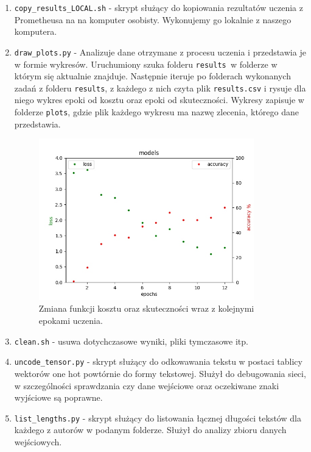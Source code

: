\begin{enumerate}
	\item {\texttt{copy\_results\_LOCAL.sh} } - skrypt służący do kopiowania rezultatów uczenia z Prometheusa na
	na komputer osobisty. Wykonujemy go lokalnie z naszego komputera.

	\item {\texttt{draw\_plots.py} } - Analizuje dane otrzymane z procesu uczenia i przedstawia je w formie wykresów.
	Uruchumiony szuka folderu \texttt{results }w folderze w którym się aktualnie znajduje. Następnie iteruje po folderach
	wykonanych zadań z folderu \texttt{results}, z każdego z nich czyta plik \texttt{results.csv} i rysuje dla niego wykres epoki od kosztu
 	oraz epoki od skuteczności. Wykresy zapisuje w folderze \texttt{plots}, gdzie plik każdego wykresu ma nazwę
 	zlecenia, którego dane przedstawia.

 	\begin{figure}[H]
	\centering
	\includegraphics[height=7cm]{./images/plot.jpg}
	\caption{Zmiana funkcji kosztu oraz skuteczności wraz z kolejnymi epokami uczenia.}
	\label{fig:test5}
	\end{figure}


	\item {\texttt{clean.sh} } - usuwa dotychczasowe wyniki, pliki tymczasowe itp.

	\item {\texttt{uncode\_tensor.py} } - skrypt służący do odkowawania tekstu w postaci tablicy wektorów one hot powtórnie do
 	formy tekstowej. Służył do debugowania sieci, w szczególności sprawdzania czy dane wejściowe oraz
 	oczekiwane znaki wyjściowe są poprawne.

 	\item {\texttt{list\_lengths.py} } - skrypt służący do listowania łącznej długości tekstów dla każdego z autorów
 	w podanym folderze. Służył do analizy zbioru danych wejściowych.



\end{enumerate}
